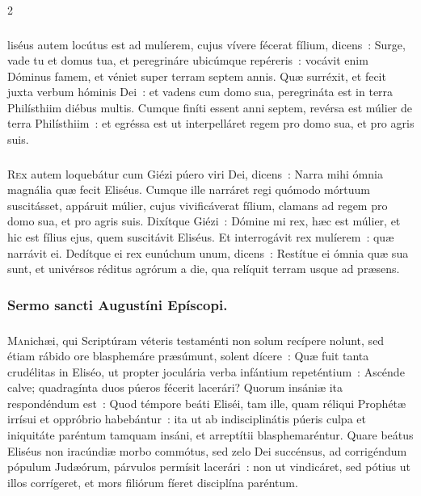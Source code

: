 \documentclass[9pt,twoside]{extarticle}
\begin{document}
\begin{multicols}{2}
{\subsubsection*{\center {}}
liséus autem locútus est ad mulíerem, cujus vívere fécerat fílium, dicens~: Surge, vade tu et domus tua, et peregrináre ubicúmque repéreris~: vocávit enim Dóminus famem, et véniet super terram septem annis.
Quæ surréxit, et fecit juxta verbum hóminis Dei~: et vadens cum domo sua, peregrináta est in terra Philísthiim diébus multis.
Cumque finíti essent anni septem, revérsa est múlier de terra Philísthiim~: et egréssa est ut interpelláret regem pro domo sua, et pro agris suis.

\begin{tightlist}{}
\item {}
\end{tightlist}

\subsubsection*{\center {}}
\lettrine{R}ex autem loquebátur cum Giézi púero viri Dei, dicens~: Narra mihi ómnia magnália quæ fecit Eliséus.
Cumque ille narráret regi quómodo mórtuum suscitásset, appáruit múlier, cujus vivificáverat fílium, clamans ad regem pro domo sua, et pro agris suis. Dixítque Giézi~: Dómine mi rex, hæc est múlier, et hic est fílius ejus, quem suscitávit Eliséus.
Et interrogávit rex mulíerem~: quæ narrávit ei. Dedítque ei rex eunúchum unum, dicens~: Restítue ei ómnia quæ sua sunt, et univérsos réditus agrórum a die, qua relíquit terram usque ad præsens.

\subsubsection*{\center Sermo sancti Augustíni Epíscopi.}
\subsubsection*{\center {}}
\lettrine{M}anichæi, qui Scriptúram véteris testaménti non solum recípere nolunt, sed étiam rábido ore blasphemáre præsúmunt, solent dícere~: Quæ fuit tanta crudélitas in Eliséo, ut propter joculária verba infántium repeténtium~: Ascénde calve; quadragínta duos púeros fécerit lacerári? Quorum insániæ ita respondéndum est~: Quod témpore beáti Eliséi, tam ille, quam réliqui Prophétæ irrísui et oppróbrio habebántur~: ita ut ab indisciplinátis púeris culpa et iniquitáte paréntum tamquam insáni, et arreptítii blasphemaréntur. Quare beátus Eliséus non iracúndiæ morbo commótus, sed zelo Dei succénsus, ad corrigéndum pópulum Judæórum, párvulos permísit lacerári~: non ut vindicáret, sed pótius ut illos corrígeret, et mors filiórum fíeret disciplína paréntum.

}
\end{multicols}
\end{document}
